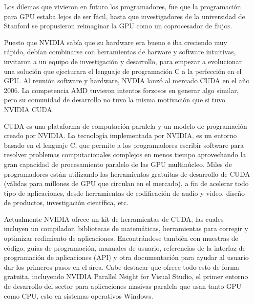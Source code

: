 Los dilemas que vivieron en futuro los programadores, fue que la programación para GPU estaba lejos de ser fácil, hasta que investigadores de la universidad de 
Stanford se propusieron reimaginar la GPU como un coprocesador de flujos.

Puesto que NVIDIA sabía que su hardware era bueno e iba creciendo muy rápido, debían combinarse con herramientas de harware y software intuitivas, invitaron
a un equipo de investigación y desarrollo, para empezar a evolucionar una solución que ejecturara el lenguaje de programación C a la perfección en el GPU.
Al reunión software y hardware, NVDIA lanzó al mercado CUDA en el año 2006. La competencia AMD tuvieron intentos forzosos en generar algo similar, pero su comunidad
de desarrollo no tuvo la misma motivación que si tuvo NVIDIA CUDA.

CUDA es una plataforma de computación paralela y un modelo de programación creado por NVIDIA.
La tecnología implementada por NVIDIA, es un entorno basado en el lenguaje C, que permite a los programadores escribir software para resolver problemas
computacionales complejos en menos tiempo aprovechando la gran capacidad de procesamiento paralelo de las GPU multinúcleo. Miles de programadores están utilizando
las herramientas gratuitas de desarrollo de CUDA (válidas para millones de GPU que circulan en el mercado), a fin de acelerar todo tipo de aplicaciones, desde
herramientas de codificación de audio y video, diseño de productos, investigación científica, etc.

Actualmente NVIDIA ofrece un kit de herramientas de CUDA, las cuales incluyen un compilador, bibliotecas de matemáticas, herramientas para corregir y optimizar
redimiento de aplicaciones. Encontrándose también con muestras de código, guías de programación, manuales de usuario, referencias de la interfaz de programación
de aplicaciones (API) y otra documentación para ayudar al usuario dar los primeros pasos en el área. Cabe destacar que ofrece todo esto de forma gratuita,
incluyendo NVIDIA Parallel Nsight for Visual Studio, el primer entorno de desarrollo del sector para aplicaciones masivas paralela que usan tanto GPU como CPU, esto
en sistemas operativos Windows.
